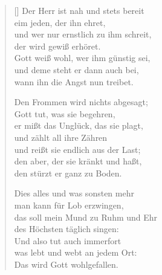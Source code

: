 \begin{multicols}{2}
\begin{verse}[\versewidth]
 Der Herr ist nah und stets bereit\\
eim jeden, der ihn ehret,\\
und wer nur ernstlich zu ihm schreit,\\
der wird gewiß erhöret.\\
Gott weiß wohl, wer ihm günstig sei,\\
und deme steht er dann auch bei,\\
wann ihn die Angst nun treibet.

 Den Frommen wird nichts abgesagt;\\
Gott tut, was sie begehren,\\
er mißt das Unglück, das sie plagt,\\
und zählt all ihre Zähren\\
und reißt sie endlich aus der Last;\\
den aber, der sie kränkt und haßt,\\
den stürzt er ganz zu Boden.

 Dies alles und was sonsten mehr\\
man kann für Lob erzwingen,\\
das soll mein Mund zu Ruhm und Ehr\\
des Höchsten täglich singen:\\
Und also tut auch immerfort\\
was lebt und webt an jedem Ort:\\
Das wird Gott wohlgefallen.

\end{verse}
\end{multicols}
